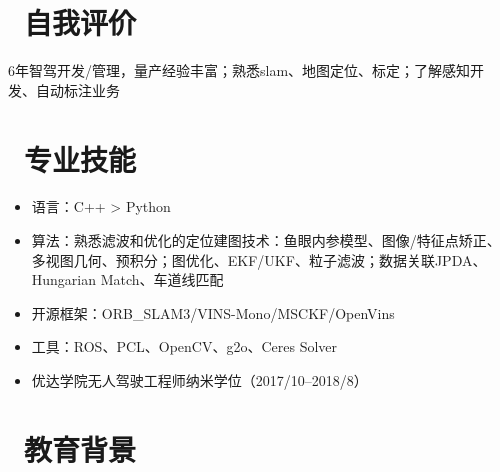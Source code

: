 \documentclass{resume}
\begin{document}




\section{\faBook\ 自我评价}
6年智驾开发/管理，量产经验丰富；熟悉slam、地图定位、标定；了解感知开发、自动标注业务

\section{\faCogs\ 专业技能}
\begin{itemize}[parsep=0.5ex]
  \item 语言：C++ > Python
  \item 算法：熟悉滤波和优化的定位建图技术：鱼眼内参模型、图像/特征点矫正、多视图几何、预积分；图优化、EKF/UKF、粒子滤波；数据关联JPDA、Hungarian Match、车道线匹配
  \item 开源框架：ORB\_SLAM3/VINS-Mono/MSCKF/OpenVins
  \item 工具：ROS、PCL、OpenCV、g2o、Ceres Solver
  \item 优达学院无人驾驶工程师纳米学位（2017/10--2018/8）
\end{itemize}

\section{\faGraduationCap\  教育背景}
\end{document}
